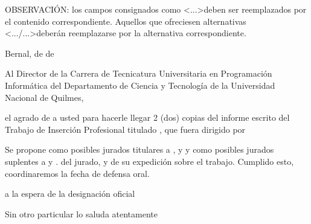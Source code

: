 \newpage
{}

OBSERVACIÓN: los campos consignados como \textless...\textgreater deben ser
reemplazados por el contenido correspondiente. Aquellos que ofreciesen
alternativas \textless.../...\textgreater deberán reemplazarse por la alternativa correspondiente.
\begin{flushright}
Bernal,  de  de 
\end{flushright}

Al Director de la Carrera de Tecnicatura Universitaria en Programación Informática del
Departamento de Ciencia y Tecnología de la
Universidad Nacional de Quilmes,


\hrulefill

 el agrado de  a
usted para hacerle llegar 2 (dos) copias del informe escrito del Trabajo de Inserción
Profesional titulado , que
fuera dirigido por 

Se propone como posibles jurados titulares a , 
y  y como posibles jurados
suplentes a  y .
del jurado, y de su expedición sobre el trabajo. Cumplido esto, coordinaremos la fecha
de defensa oral.

 a la espera de la designación oficial

Sin otro particular lo saluda atentamente\\ \\
\begin{flushright}
\\
\\
\\
\\
\\
\\
\\
\\
\\
\\
\end{flushright}



